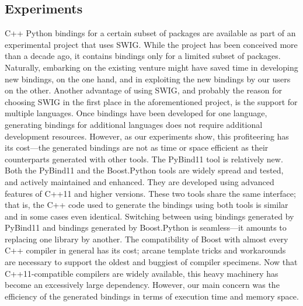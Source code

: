 \subsection{Experiments}
\label{ssec:comp:exp}
C++ Python bindings for a certain subset of \cgal{} packages are available as part of an experimental project that uses SWIG. While the project has been conceived more than a decade ago, it contains bindings only for a limited subset of \cgal{} packages. Naturally, embarking on the existing venture might have saved time in developing new bindings, on the one hand, and in exploiting the new bindings by our users on the other. Another advantage of using SWIG, and probably the reason for choosing SWIG in the first place in the aforementioned project, is the support for multiple languages. Once bindings have been developed for one language, generating bindings for additional languages does not require additional development resources. However, as our experiments show, this profiteering has its cost---the generated bindings are not as time or space efficient as their counterparts generated with other tools. The PyBind11 tool is relatively new. Both the PyBind11 and the Boost.Python tools are widely spread and tested, and actively maintained and enhanced. They are developed using advanced features of C++11 and higher versions. These two tools share the same interface; that is, the C++ code used to generate the bindings using both tools is similar and in some cases even identical. Switching between using bindings generated by PyBind11 and bindings generated by Boost.Python is seamless---it amounts to replacing one library by another.
The compatibility of Boost with almost every C++ compiler in general has its cost; arcane template tricks and workarounds are necessary to support the oldest and buggiest of compiler specimens.  Now that C++11-compatible compilers are widely available, this heavy machinery has become an excessively large dependency. However, our main concern was the efficiency of the generated bindings in terms of execution time and memory space.

